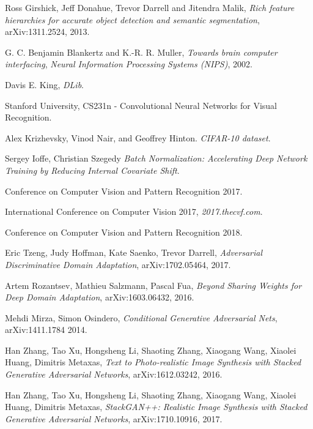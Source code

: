 \begin{thebibliography}{}
	Ross Girshick, Jeff Donahue, Trevor Darrell and Jitendra Malik,
    \emph{Rich feature hierarchies for accurate object detection and semantic segmentation},
	arXiv:1311.2524, 2013.

	G. C. Benjamin Blankertz and K.-R. R. Muller,
    \emph{Towards brain computer interfacing},
	\emph{Neural Information Processing Systems (NIPS)},
	2002.


	Davis E. King,
    \emph{DLib}.



	Stanford University,
	CS231n - Convolutional Neural Networks for Visual Recognition.

    Alex Krizhevsky, Vinod Nair, and Geoffrey Hinton.
	\emph{CIFAR-10 dataset}.



    Sergey Ioffe, Christian Szegedy
    \emph{Batch Normalization: Accelerating Deep Network Training by Reducing Internal Covariate Shift}.


	Conference on Computer Vision and Pattern Recognition 2017.

	International Conference on Computer Vision 2017,
    \emph{2017.thecvf.com}.

	Conference on Computer Vision and Pattern Recognition 2018.

    Eric Tzeng, Judy Hoffman, Kate Saenko, Trevor Darrell,
    \emph{Adversarial Discriminative Domain Adaptation},
    arXiv:1702.05464, 2017.

    Artem Rozantsev, Mathieu Salzmann, Pascal Fua,
    \emph{Beyond Sharing Weights for Deep Domain Adaptation},
    arXiv:1603.06432, 2016.

    Mehdi Mirza, Simon Osindero,
    \emph{Conditional Generative Adversarial Nets},
    arXiv:1411.1784 2014.

    Han Zhang, Tao Xu, Hongsheng Li, Shaoting Zhang, Xiaogang Wang, Xiaolei Huang, Dimitris Metaxas,
    \emph{Text to Photo-realistic Image Synthesis with Stacked Generative Adversarial Networks},
    arXiv:1612.03242, 2016.

    Han Zhang, Tao Xu, Hongsheng Li, Shaoting Zhang, Xiaogang Wang, Xiaolei Huang, Dimitris Metaxas,
    \emph{StackGAN++: Realistic Image Synthesis with Stacked Generative Adversarial Networks},
    arXiv:1710.10916, 2017.
    


\end{thebibliography}
